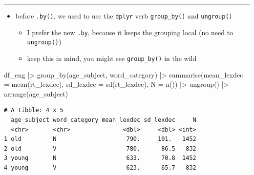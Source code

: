 \documentclass[
  letterpaper,
  DIV=11,
  numbers=noendperiod]{scrartcl}
\newenvironment{Shaded}{\begin{snugshade}}{\end{snugshade}}
\newcommand{\AttributeTok}[1]{\textcolor[rgb]{0.40,0.45,0.13}{#1}}
\newcommand{\FunctionTok}[1]{\textcolor[rgb]{0.28,0.35,0.67}{#1}}
\newcommand{\NormalTok}[1]{\textcolor[rgb]{0.00,0.23,0.31}{#1}}
\newcommand{\SpecialCharTok}[1]{\textcolor[rgb]{0.37,0.37,0.37}{#1}}
\providecommand{\tightlist}{%
  \setlength{\itemsep}{0pt}\setlength{\parskip}{0pt}}\usepackage{longtable,booktabs,array}
\begin{document}
\begin{center}\rule{0.5\linewidth}{0.5pt}\end{center}

\begin{tcolorbox}[enhanced jigsaw, colframe=quarto-callout-note-color-frame, rightrule=.15mm, breakable, coltitle=black, opacityback=0, leftrule=.75mm, colback=white, toprule=.15mm, opacitybacktitle=0.6, colbacktitle=quarto-callout-note-color!10!white, bottomrule=.15mm, toptitle=1mm, left=2mm, titlerule=0mm, arc=.35mm, title=\textcolor{quarto-callout-note-color}{\faInfo}\hspace{0.5em}{\texttt{group\_by()}}, bottomtitle=1mm]

\begin{itemize}
\tightlist
\item
  before \texttt{.by()}, we used to use the \texttt{dplyr} verb
  \texttt{group\_by()} and \texttt{ungroup()}

  \begin{itemize}
  \tightlist
  \item
    I prefer the new \texttt{.by}, because it keeps the grouping local
    (no need to \texttt{ungroup()})
  \item
    keep this in mind, you might see \texttt{group\_by()} in the wild
  \end{itemize}
\end{itemize}

\begin{Shaded}
\begin{Highlighting}[numbers=left,,]
\NormalTok{df\_eng }\SpecialCharTok{|\textgreater{}}
  \FunctionTok{group\_by}\NormalTok{(age\_subject, word\_category) }\SpecialCharTok{|\textgreater{}} 
  \FunctionTok{summarise}\NormalTok{(}\AttributeTok{mean\_lexdec =} \FunctionTok{mean}\NormalTok{(rt\_lexdec),}
            \AttributeTok{sd\_lexdec =} \FunctionTok{sd}\NormalTok{(rt\_lexdec),}
            \AttributeTok{N =} \FunctionTok{n}\NormalTok{()) }\SpecialCharTok{|\textgreater{}} 
  \FunctionTok{ungroup}\NormalTok{() }\SpecialCharTok{|\textgreater{}} 
  \FunctionTok{arrange}\NormalTok{(age\_subject)}
\end{Highlighting}
\end{Shaded}

\begin{verbatim}
# A tibble: 4 x 5
  age_subject word_category mean_lexdec sd_lexdec     N
  <chr>       <chr>               <dbl>     <dbl> <int>
1 old         N                    790.     101.   1452
2 old         V                    780.      86.5   832
3 young       N                    633.      70.8  1452
4 young       V                    623.      65.7   832
\end{verbatim}

\end{tcolorbox}
\end{document}
